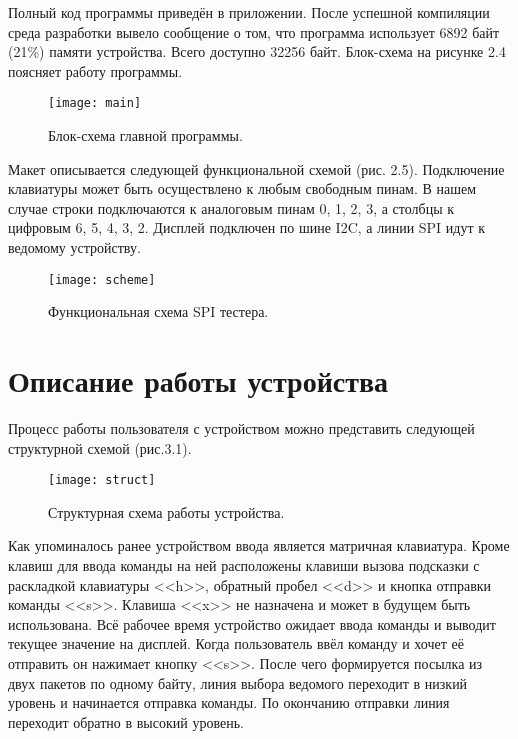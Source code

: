 \documentclass[14pt, oneside]{altsu-report}
\begin{document}
	Полный код программы приведён в приложении. После успешной компиляции среда разработки вывело сообщение о том, что программа использует 6892 байт (21\%) памяти устройства. Всего доступно 32256 байт. 
	\newpage
	Блок-схема на рисунке 2.4 поясняет работу программы.
	\begin{figure}[H]
	\begin{center}
	\texttt{[image: main]}
	\end{center}	
	\caption{Блок-схема главной программы.}
	\end{figure}	
	
	\newpage
	Макет описывается следующей функциональной схемой (рис. 2.5). Подключение клавиатуры может быть осуществлено к любым свободным пинам. В нашем случае строки подключаются к аналоговым пинам 0, 1, 2, 3, а столбцы к цифровым 6, 5, 4, 3, 2. Дисплей подключен по шине I2C, а линии SPI идут к ведомому устройству. 
	\begin{figure}[H]
	\begin{center}
	\texttt{[image: scheme]}
	\end{center}	
	\caption{Функциональная схема SPI тестера.}
	\end{figure}	
	
		
\chapter{Описание работы устройства}
	Процесс работы пользователя с устройством можно представить следующей структурной схемой (рис.3.1). 
	\begin{figure}[H]
	\begin{center}
	\texttt{[image: struct]} 
	\end{center}	
	\caption{Структурная схема работы устройства.}
	\end{figure}	
	
	Как упоминалось ранее устройством ввода является матричная клавиатура. Кроме клавиш для ввода команды на ней расположены клавиши вызова подсказки с раскладкой клавиатуры <<h>>, обратный пробел <<d>> и кнопка отправки команды <<s>>. Клавиша <<x>> не назначена и может в будущем быть использована. Всё рабочее время устройство ожидает ввода команды и выводит текущее значение на дисплей. Когда пользователь ввёл команду и хочет её отправить он нажимает кнопку <<s>>. После чего формируется посылка из двух пакетов по одному байту, линия выбора ведомого переходит в низкий уровень и начинается отправка команды. По окончанию отправки линия переходит обратно в высокий уровень. 
\end{document}
